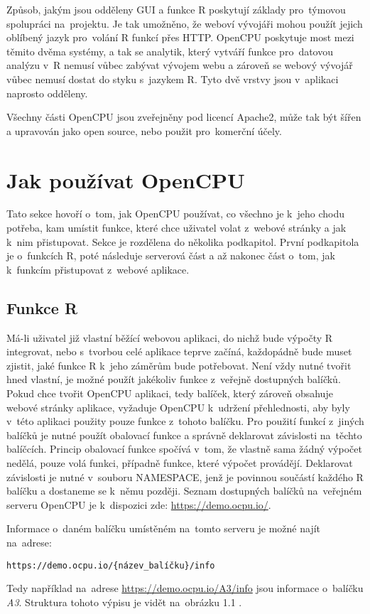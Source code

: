 \documentclass[thesis=B,czech]{FITthesis}[2012/06/26]
\begin{document}
Způsob, jakým jsou odděleny GUI a funkce R poskytují základy pro~týmovou spolupráci na~projektu. Je tak umožněno, že weboví vývojáři mohou použít jejich oblíbený jazyk pro~volání R funkcí přes HTTP. OpenCPU poskytuje most mezi těmito dvěma systémy, a tak se analytik, který vytváří funkce pro~datovou analýzu v~R nemusí vůbec zabývat vývojem webu a zároveň se webový vývojář vůbec nemusí dostat do styku s~jazykem R. Tyto dvě vrstvy jsou v~aplikaci naprosto odděleny.

Všechny části OpenCPU jsou zveřejněny pod licencí Apache2, může tak být šířen a upravován jako open source, nebo použit pro~komerční účely.

\section{Jak používat OpenCPU}
Tato sekce hovoří o~tom, jak OpenCPU používat, co všechno je k~jeho chodu potřeba, kam umístit funkce, které chce uživatel volat z~webové stránky a jak k~nim přistupovat. Sekce je rozdělena do několika podkapitol. První podkapitola je o~funkcích R, poté následuje serverová část a až nakonec část o~tom, jak k~funkcím přistupovat z~webové aplikace.   

\subsection{Funkce R}
Má-li uživatel již vlastní běžící webovou aplikaci, do nichž bude výpočty R integrovat, nebo s~tvorbou celé aplikace teprve začíná, každopádně bude muset zjistit, jaké funkce R k~jeho záměrům bude potřebovat. Není vždy nutné tvořit hned vlastní, je možné použít jakékoliv funkce z~veřejně dostupných balíčků. Pokud chce tvořit OpenCPU aplikaci, tedy balíček, který zároveň obsahuje webové stránky aplikace, vyžaduje OpenCPU k~udržení přehlednosti, aby byly v~této aplikaci použity pouze funkce z~tohoto balíčku. Pro použití funkcí z~jiných balíčků je nutné použít obalovací funkce a správně deklarovat závislosti na~těchto balíčcích. Princip obalovací funkce spočívá v~tom, že vlastně sama žádný výpočet nedělá, pouze volá funkci, případně funkce, které výpočet provádějí. Deklarovat závislosti je nutné v~souboru NAMESPACE, jenž je povinnou součástí každého R balíčku a dostaneme se k~němu později. Seznam dostupných balíčků na~veřejném serveru OpenCPU je k~dispozici zde: \url{https://demo.ocpu.io/}. 

Informace o~daném balíčku umístěném na~tomto serveru je možné najít na~adrese:
\begin{alltt}
https://demo.ocpu.io/\{název_balíčku\}/info
\end{alltt}
Tedy například na~adrese \url{https://demo.ocpu.io/A3/info} jsou informace o~balíčku \textit{A3}. Struktura tohoto výpisu je vidět na~obrázku 1.1 .
\end{document}
